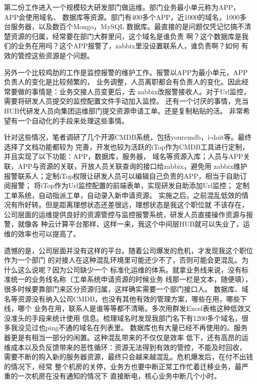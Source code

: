 \documentclass[fancyhdr,bookmark]{ctexbook}
\begin{document}
第二份工作进入一个规模较大研发部门做运维。部门业务最小单元称为APP，APP会使用域名、
数据库等资源。部门有400多个APP，近1000的域名，1000多台服务器，以及数百个Mongo，MySQL
数据库。最直接的是问题仅凭记忆搞不清楚资源的归属，经常要在部门大群里问，这个域名是谁负责
啊？这个数据库是我们的业务在用吗？这个APP报警了，zabbix里没设置联系人，谁负责啊？如何
有效的管控这些资源是个问题。

另外一个比较鸡肋的工作是监控报警的维护工作。报警以APP为最小单元，APP负责人的变化是比较频繁的，
业务调整，人员离职都会有负责人的变化。因此经常要做的事情是：业务交接人员变更后，去
zabbix改报警接收人。对于Url监控，需要将研发人员提交的监控配置文件手动加入监控。
还有一个讨厌的事情，充当HUB代研发人员向集团运维部门提交资源申请工单。还是复制粘贴的活。
非常希望有一个自动化的手段来处理这些事情。

针对这些情况，笔者调研了几个开源CMDB系统，包括yourcmdb，i-doit等。最终选择了文档功能都较为
完善，开发也较为活跃的iTop作为CMDB工具进行定制，并且实现了以下功能：APP，数据库，服务器，
域名等资源入库；人员与APP关联，APP与资源的关联，开放人员关联查询的接口给zabbix，避免用
zabbix维护报警联系人；定制iTop权限让研发人员可以编辑自己负责的APP，相当于自助订阅报警；
将iTop作为Url监控配置的前端表单，实现研发自助添加Url监控；
定制工单系统，自动指派工单，自动录入新申请资源。
实施之后，之前混乱低效的情况有所好转。但是距离理想状态还差很远，理想状态是我这个职位就
不该存在，公司层面的运维提供良好的资源管控与监控报警系统，研发人员直接操作资源与报警，就像各
种云计算平台那样，这样一来，我这个中间层HUB就可以失业了，运维的效率也可以提高了。

遗憾的是，公司层面并没有这样的平台。随着公司爆发的危机，才发现我这个职位作为一个部门
的对接人在这种混乱环境里可能还少不了，否则可能会更混乱。为什么这么说呢？因为公司缺少一个
标准化运维的体系。就拿业务线来说，没有标准统一的业务线名称（工单系统申请资源的时候业务
线那一栏是文本，随便填），很多时候要靠部门来区分资源归属，这样确实需要一个部门接口人。
数据库、域名等资源没有纳入公司CMDB，也没有其他有效的管理方案，哪些在用，哪些下线，哪个
业务在用，联系人是谁等等都不清晰。多次用群发Excel表格这种低效又没准头的手段来统计使用
信息。梳理域名时发现我部门名下有1200多个域名，很多我没见过也ping不通的域名在列表里。
数据库也有大量已经不再使用的。服务器更是有相当一部分的闲置。这种混乱带来的不仅仅是效率
低下，还有高昂的运维成本以及负反馈带来的恶性循环：资源无法得到有效的管控，不能及时回收，
需要不断的购入新的服务器资源，最终只会越来越混乱。危机爆发后，在付不出钱的情况下，经常
整个机房的关停，业务方也要中断正常工作忙着迁移业务，最严重的一次机房在没有通知的情况下
直接断电，核心业务中断几个小时。
\end{document}
